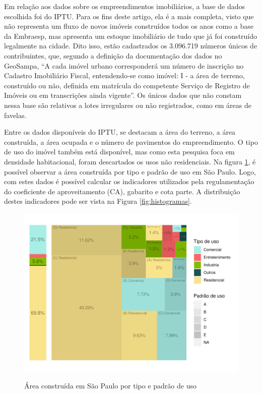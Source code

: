 Em relação aos dados sobre os empreendimentos imobiliários, a base de dados escolhida foi do IPTU. Para os fins deste artigo, ela é a mais completa, visto que não representa um fluxo de novos imóveis construídos todos os anos como a base da Embraesp, mas apresenta um estoque imobiliário de tudo que já foi construído legalmente na cidade. Dito isso, estão cadastrados os 3.096.719 números únicos de contribuintes, que, segundo a definição da documentação dos dados no GeoSampa, ``A cada imóvel urbano corresponderá um número de inscrição no Cadastro Imobiliário Fiscal, entendendo-se como imóvel: I - a área de terreno, construído ou não, definida em matrícula do competente Serviço de Registro de Imóveis ou em transcrições ainda vigente''. Os únicos dados que não constam nessa base são relativos a lotes irregulares ou não registrados, como em áreas de favelas. 

Entre os dados disponíveis do IPTU, se destacam a área do terreno, a área construída, a área ocupada e o número de pavimentos do empreendimento. O tipo de uso do imóvel também está disponível, mas como esta pesquisa foca em densidade habitacional, foram descartados os usos não residenciais. Na figura \ref{fig:area_construida}, é possível observar a área construída por tipo e padrão de uso em São Paulo. Logo, com estes dados é possível calcular os indicadores utilizados pela regulamentação do coeficiente de aproveitamento (CA), gabarito e cota parte. A distribuição destes indicadores pode ser vista na Figura \ref{fig:histogramas}.

\begin{figure}[h]
    \centering
    \caption{Área construída em São Paulo por tipo e padrão de uso}
    \includegraphics[width = .8\linewidth]{imagens/tree_area_construida.pdf}
    \label{fig:area_construida}
\end{figure}

